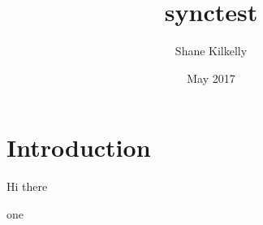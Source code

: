 \documentclass{article}
\title{synctest}
\author{Shane Kilkelly}
\date{May 2017}
\begin{document}
\maketitle

\section{Introduction}


Hi
there

one
\end{document}
